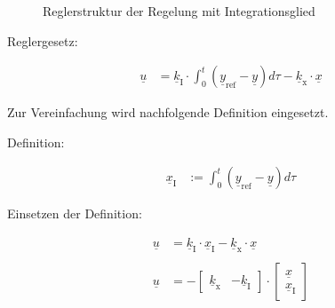 \begin{figure}[H]
   \centering
   \caption[Reglerstruktur der I-Regelung]{Reglerstruktur der Regelung mit Integrationsglied}
   \label{fig:Bild11}
\end{figure}

Reglergesetz:

\begin{align}
    \underline{u} &= \underline{k}_{\mathrm{I}}\cdot\int_{0}^t(\underline{y}_{\mathrm{ref}}-\underline{y})d\tau-\underline{k}_{\mathrm{x}}\cdot\underline{x}
    \label{eq:Gleichung25}
\end{align}

Zur Vereinfachung wird nachfolgende Definition eingesetzt.\\
\newline

Definition:

\begin{align*}
    \underline{x}_{\mathrm{I}}& :=\int_{0}^t(\underline{y}_{\mathrm{ref}}-\underline{y})d\tau
\end{align*}

Einsetzen der Definition:

\begin{align}
    \underline{u} &= \underline{k}_{\mathrm{I}}\cdot\underline{x}_{\mathrm{I}}-\underline{k}_{\mathrm{x}}\cdot\underline{x} \\ \nonumber \\
    \underline{u} &= -
    \begin{bmatrix}
        \underline{k}_{\mathrm{x}} & -\underline{k}_{\mathrm{I}}
    \end{bmatrix}
    \cdot
    \begin{bmatrix}
        \underline{x} \\
        \underline{x}_{\mathrm{I}}
    \end{bmatrix}
    \nonumber
\end{align}

